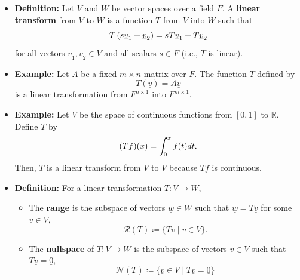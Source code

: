 \documentclass[11pt,twoside]{report}
\newcommand{\bbR}{{\mathbb{R}}}
\newcommand{\vecnot}{\underline}
\newcommand{\Span}{\mathrm{span}}
\begin{document}
\begin{itemize}
\item \textbf{Definition:} Let $V$ and $W$ be vector spaces over a field $F$.
A \textbf{linear transform} from $V$ to $W$ is a function $T$ from $V$ into $W$ such that 
\begin{equation*}
T \left( s \vecnot{v}_1 + \vecnot{v}_2 \right)
= s T \vecnot{v}_1 + T \vecnot{v}_2  \vspace{-2mm}
\end{equation*}
for all vectors $\vecnot{v}_1, \vecnot{v}_2 \in V$ and all scalars $s \in F$ (i.e., $T$ is linear).

\item \textbf{Example:} Let $A$ be a fixed $m \times n$ matrix over $F$.
The function $T$ defined by 
\[
T \left( \vecnot{v} \right) = A \vecnot{v}
\]
is a linear transformation from $F^{n \times 1}$ into $F^{m \times 1}$.

\item \textbf{Example:}  Let $V$ be the space of continuous functions from $[0,1]$ to $\bbR$. Define $T$ by  
\begin{equation*}
(Tf)(x) = \int_{0}^x f(t) dt .  \vspace{-2mm}
\end{equation*}
Then, $T$ is a linear transform from $V$ to $V$ because $Tf$ is continuous.


\item \textbf{Definition:} 
For a linear transformation $T \colon V \to W$, 
\begin{itemize}
\item  The \textbf{range}  is the subspace of vectors $\vecnot{w} \in W$ such that $\vecnot{w} = T \vecnot{v}$ for some $\vecnot{v} \in V$, 
\[
 \mathcal{R}(T)\coloneqq%
  \{ T \vecnot{v} \mid \vecnot{v} \in V\}. 
\]

\item  The \textbf{nullspace} of $T\colon V \to W$ is the subspace of vectors $\vecnot{v} \in V$ such that $T \vecnot{v} = \vecnot{0}$,
\[ 
\mathcal{N}(T)  \coloneqq \{ \vecnot{v}\in V \mid T \vecnot{v} = \vecnot{0} \} 
\]

\end{itemize} 



\end{itemize}
\end{document}
